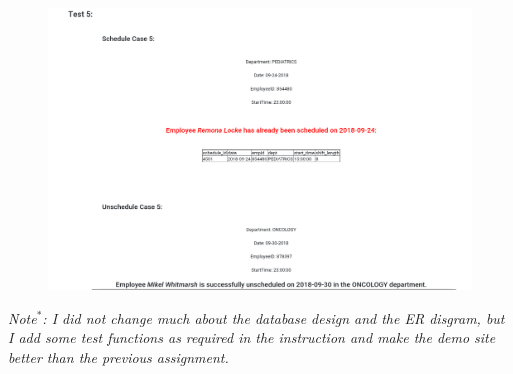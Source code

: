 \documentclass[11pt]{article}
\makeatletter
\def\maxwidth{\ifdim\Gin@nat@width>\linewidth\linewidth
    \else\Gin@nat@width\fi}
\let\Oldincludegraphics\includegraphics
\renewcommand{\includegraphics}[1]{\Oldincludegraphics[width=.8\maxwidth]{#1}}
\makeatother
\begin{document}
\begin{figure}[H]
        \centering
        \includegraphics{8.png}
        \caption{}
    \end{figure}

    \emph{Note\(^*\): I did not change much about the database design and
the ER disgram, but I add some test functions as required in the
instruction and make the demo site better than the previous assignment.}


    
    
    
    
\end{document}
